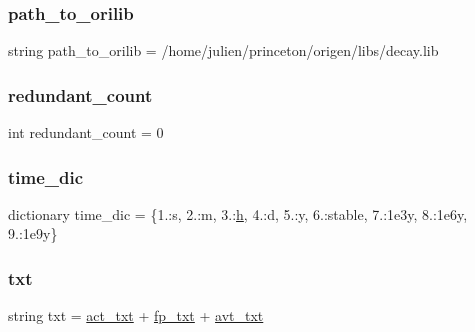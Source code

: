 \subsubsection{\texorpdfstring{path\+\_\+to\+\_\+orilib}{path\_to\_orilib}}
{\footnotesize\ttfamily string path\+\_\+to\+\_\+orilib = \textquotesingle{}/home/julien/princeton/origen/libs/decay.\+lib\textquotesingle{}}

\mbox{\label{namespaceconv__decaylib_a50906674ebce7d2b1e55407dc2e88974}} 
\subsubsection{\texorpdfstring{redundant\+\_\+count}{redundant\_count}}
{\footnotesize\ttfamily int redundant\+\_\+count = 0}

\mbox{\label{namespaceconv__decaylib_aa41c6cd0c7b7ba06cd598f2cdacecf28}} 
\subsubsection{\texorpdfstring{time\+\_\+dic}{time\_dic}}
{\footnotesize\ttfamily dictionary time\+\_\+dic = \{1.\+:\textquotesingle{}s\textquotesingle{}, 2.\+:\textquotesingle{}m\textquotesingle{}, 3.\+:\textquotesingle{}\mbox{\hyperlink{namespaceconv__decaylib_a16611451551e3d15916bae723c3f59f7}{h}}\textquotesingle{}, 4.\+:\textquotesingle{}d\textquotesingle{}, 5.\+:\textquotesingle{}y\textquotesingle{}, 6.\+:\textquotesingle{}stable\textquotesingle{}, 7.\+:\textquotesingle{}1e3y\textquotesingle{}, 8.\+:\textquotesingle{}1e6y\textquotesingle{}, 9.\+:\textquotesingle{}1e9y\textquotesingle{}\}}

\mbox{\label{namespaceconv__decaylib_af306301328dca1eed4e07dc5350e8569}} 
\subsubsection{\texorpdfstring{txt}{txt}}
{\footnotesize\ttfamily string txt = \mbox{\hyperlink{namespaceconv__decaylib_a5588daf6fd7dfde8180f1981bd3e8443}{act\+\_\+txt}} + \mbox{\hyperlink{namespaceconv__decaylib_abcdb1a110e2a54bac4567f258e4e314f}{fp\+\_\+txt}} + \mbox{\hyperlink{namespaceconv__decaylib_a76d920bafd8fdcc24379791482eeae00}{avt\+\_\+txt}}}


